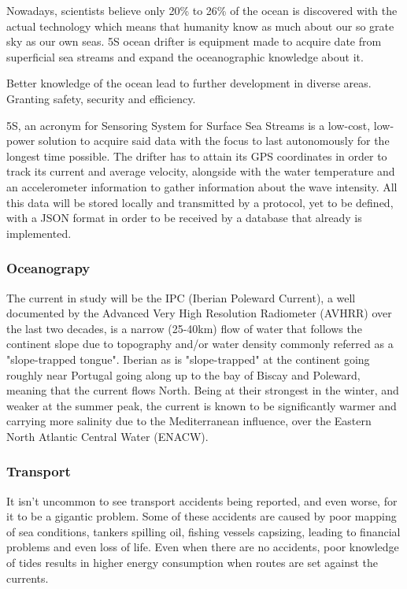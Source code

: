Nowadays, scientists believe only 20\% to 26\% of the ocean is discovered with the actual technology which means that humanity 
know as much about our so grate sky as our own seas. 5S ocean drifter is equipment made to acquire date from 
superficial sea streams and expand the oceanographic knowledge about it.

Better knowledge of the ocean lead to further development in diverse areas. Granting safety,
security and efficiency.

5S, an acronym for Sensoring System for Surface Sea Streams is a low-cost, low-power solution to acquire
said data with the focus to last autonomously for the longest time possible. The drifter has to attain its GPS
coordinates in order to track its current and average velocity, alongside with the water temperature and an accelerometer 
information to gather information about the wave intensity. All this data will be stored locally and transmitted by a protocol,
yet to be defined, with a JSON format in order to be received by a database that already is implemented.  


\subsubsection{Oceanograpy}
\label{sec:Oceanograpy}
The current in study will be the IPC (Iberian Poleward Current), a well documented by the Advanced Very High Resolution Radiometer (AVHRR)
over the last two decades, is a narrow (25-40km) flow of water that follows the continent slope due to topography and/or water density
commonly referred as a "slope-trapped tongue". Iberian as is "slope-trapped" at the continent going roughly near Portugal going along 
up to the bay of Biscay and Poleward, meaning that the current flows North. Being at their strongest in the winter, and weaker at the summer
peak, the current is known to be significantly warmer and carrying more salinity due to the Mediterranean influence, over the 
Eastern North Atlantic Central Water (ENACW).

\subsubsection{Transport}
It isn't uncommon to see transport accidents being reported, and even worse, for it to be a gigantic problem.
Some of these accidents are caused by poor mapping of sea conditions, tankers spilling oil, fishing vessels capsizing, leading
to financial problems and even loss of life. Even when there are no accidents, poor knowledge of tides results in higher energy consumption when routes are set against the currents.

